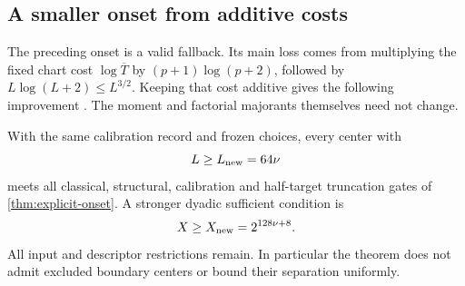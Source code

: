 \subsection{A smaller onset from additive costs}
\label{subsec:linear-onset}
The preceding onset is a valid fallback. Its main loss comes from
multiplying the fixed chart cost \(\log\overline T\) by
\((p+1)\log(p+2)\), followed by \(L\log(L+2)\le L^{3/2}\).
Keeping that cost additive gives the following improvement
\cite{rec16}. The moment and factorial majorants themselves need not change.

\begin{theorem}\label{thm:linear-onset}
With the same calibration record and frozen choices, every center with
\begin{equation}
 L\ge L_{\rm new}=64\nu
 \label{eq:linear-onset}
\end{equation}
meets all classical, structural, calibration and half-target truncation
gates of \cref{thm:explicit-onset}. A stronger dyadic sufficient condition is
\begin{equation}
 X\ge X_{\rm new}=2^{128\nu+8}.
 \label{eq:linear-dyadic-onset}
\end{equation}
All input and descriptor restrictions remain. In particular the theorem
does not admit excluded boundary centers or bound their separation uniformly.
\end{theorem}
